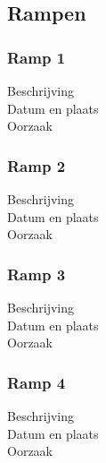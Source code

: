 \documentclass{article}%
\begin{document}
\subsection{Rampen}

\subsubsection{Ramp 1}
\begin{description}
\item[Beschrijving]
\item[Datum en plaats] 
\item[Oorzaak]
\end{description}

\subsubsection{Ramp 2}
\begin{description}
\item[Beschrijving]
\item[Datum en plaats] 
\item[Oorzaak]
\end{description}

\subsubsection{Ramp 3}
\begin{description}
\item[Beschrijving]
\item[Datum en plaats] 
\item[Oorzaak]
\end{description}

\subsubsection{Ramp 4}
\begin{description}
\item[Beschrijving]
\item[Datum en plaats] 
\item[Oorzaak]
\end{description}
\end{document}
